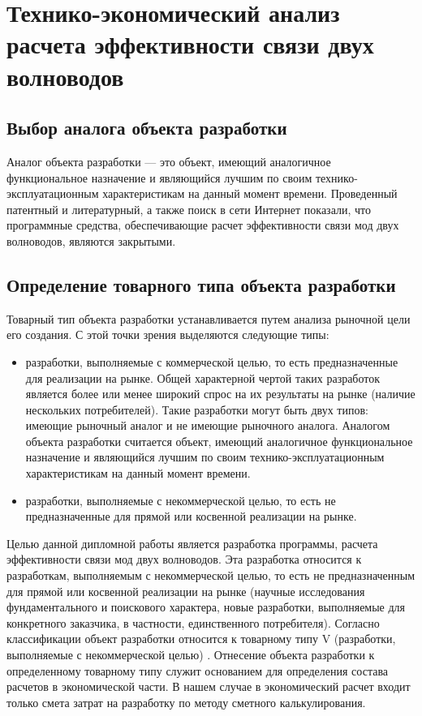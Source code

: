 \chapter{Технико-экономический анализ расчета эффективности связи двух волноводов}
\section{Выбор аналога объекта разработки}
Аналог объекта разработки — это объект, имеющий аналогичное функциональное назначение и являющийся лучшим по своим технико-эксплуатационным характеристикам на данный момент времени.
Проведенный патентный и литературный, а также поиск в сети Интернет показали, что программные средства, обеспечивающие расчет эффективности связи мод двух волноводов, являются закрытыми.

\section{Определение товарного типа объекта разработки}
Товарный тип объекта разработки устанавливается путем анализа рыночной цели его создания. С этой точки зрения выделяются следующие типы:
\begin{itemize}
	\item разработки, выполняемые с коммерческой целью, то есть предназначенные для реализации на рынке. Общей характерной чертой  таких разработок является более или менее широкий спрос на их результаты на рынке (наличие нескольких потребителей). Такие разработки могут быть двух типов: имеющие рыночный аналог и не имеющие  рыночного аналога. Аналогом объекта разработки считается объект, имеющий аналогичное функциональное назначение и являющийся лучшим по своим технико-эксплуатационным характеристикам на данный момент времени.
	\item разработки, выполняемые с некоммерческой целью, то есть не предназначенные для прямой или косвенной реализации на рынке.
\end{itemize}
Целью данной дипломной работы является разработка программы, расчета эффективности связи мод двух волноводов. Эта разработка относится к разработкам, выполняемым с некоммерческой целью, то есть не предназначенным для прямой или косвенной реализации на рынке (научные исследования фундаментального и поискового характера, новые разработки, выполняемые для конкретного заказчика, в частности, единственного потребителя). 
Согласно классификации объект разработки относится к товарному типу V (разработки, выполняемые с некоммерческой целью) \cite{economics}. Отнесение объекта разработки к определенному товарному типу служит основанием для определения состава расчетов в экономической части. В нашем случае в экономический расчет входит только смета затрат на разработку по методу сметного калькулирования.

